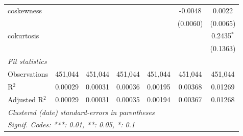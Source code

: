 \begin{table}[H]
\begin{tabular}{lcccccc}
      coskewness     &              &          &          &          & -0.0048      & 0.0022\\   
                     &              &          &          &          & (0.0060)     & (0.0065)\\   
      cokurtosis     &              &          &          &          &              & 0.2435$^{*}$\\   
                     &              &          &          &          &              & (0.1363)\\   
      \midrule
      \emph{Fit statistics}\\
      Observations   & 451,044      & 451,044  & 451,044  & 451,044  & 451,044      & 451,044\\  
      R$^2$          & 0.00029      & 0.00031  & 0.00036  & 0.00195  & 0.00368      & 0.01269\\  
      Adjusted R$^2$ & 0.00029      & 0.00031  & 0.00035  & 0.00194  & 0.00367      & 0.01268\\  
      \midrule \midrule
      \multicolumn{7}{l}{\emph{Clustered (date) standard-errors in parentheses}}\\
      \multicolumn{7}{l}{\emph{Signif. Codes: ***: 0.01, **: 0.05, *: 0.1}}\\
   \end{tabular}
\end{table}

